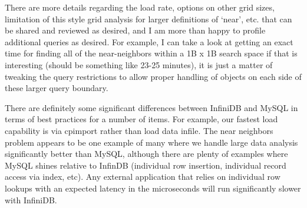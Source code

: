 \documentclass[DM,lsstdraft,toc]{lsstdoc}
\begin{document}
There are more details regarding the load rate, options on other grid
sizes, limitation of this style grid analysis for larger definitions of
`near', etc. that can be shared and reviewed as desired, and I am more
than happy to profile additional queries as desired. For example, I can
take a look at getting an exact time for finding all of the
near-neighbors within a 1B x 1B search space if that is interesting
(should be something like 23-25 minutes), it is just a matter of
tweaking the query restrictions to allow proper handling of objects on
each side of these larger query boundary.

There are definitely some significant differences between InfiniDB and
MySQL in terms of best practices for a number of items. For example, our
fastest load capability is via cpimport rather than load data infile.
The near neighbors problem appears to be one example of many where we
handle large data analysis significantly better than MySQL, although
there are plenty of examples where MySQL shines relative to InfinDB
(individual row insertion, individual record access via index, etc). Any
external application that relies on individual row lookups with an
expected latency in the microseconds will run significantly slower with
InfiniDB.
\end{document}
